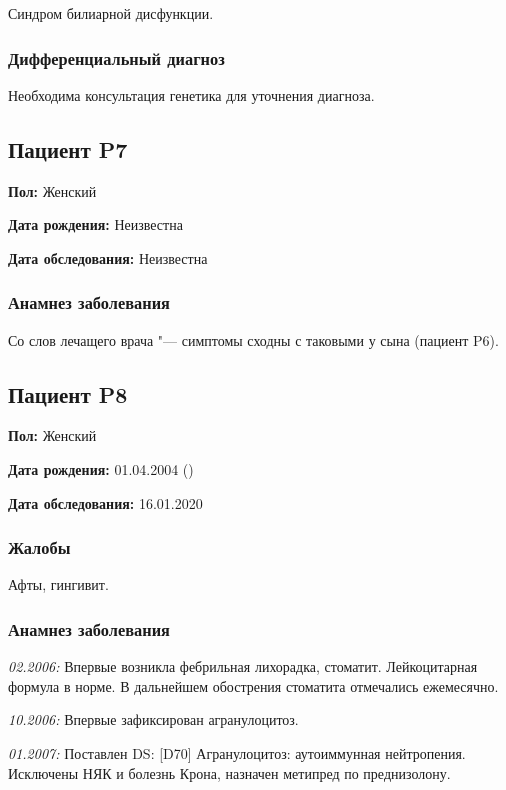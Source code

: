\documentclass[a4paper,14pt]{extarticle}
\newcommand{\mgpkg}{мг/кг}
\newcommand{\pdate}[1]{\emph{#1:} }
\newcommand{\DS}[2]{[#2] #1}
\begin{document}
Синдром билиарной дисфункции.

\subsubsection*{Дифференциальный диагноз}

Необходима консультация генетика для уточнения диагноза.

\newpage
\subsection*{Пациент P7}

\textbf{Пол:} Женский

\textbf{Дата рождения:} Неизвестна

\textbf{Дата обследования:} Неизвестна

\subsubsection*{Анамнез заболевания}

Со слов лечащего врача "--- симптомы сходны с таковыми у сына (пациент P6).

\newpage
\subsection*{Пациент P8}

\textbf{Пол:} Женский

\textbf{Дата рождения:} 01.04.2004 ()

\textbf{Дата обследования:} 16.01.2020

\subsubsection*{Жалобы}

Афты, гингивит.

\subsubsection*{Анамнез заболевания}

\pdate{02.2006} Впервые возникла фебрильная лихорадка, стоматит. Лейкоцитарная формула в норме. В дальнейшем обострения стоматита отмечались ежемесячно.

\pdate{10.2006} Впервые зафиксирован агранулоцитоз.

\pdate{01.2007} Поставлен DS: \DS{Агранулоцитоз: аутоиммунная нейтропения}{D70}. Исключены НЯК и болезнь Крона, назначен метипред \numprint[\mgpkg]{1} по преднизолону.
\end{document}
